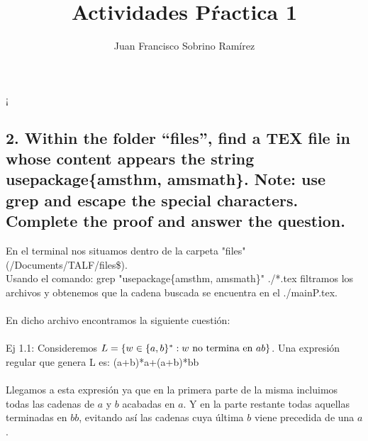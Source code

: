 \documentclass[20pt,oneside]{extbook}
\title{\Huge {Actividades Pŕactica 1}}
\author{Juan Francisco Sobrino Ramírez}
\date{}
\begin{document}
\maketitle

\newpage 
¡


\subsection*{2. Within the folder “files”, find a TEX file in whose content appears the string usepackage\{amsthm, amsmath\}. Note: use grep and escape the special characters.\\Complete the proof and answer the question.}
 
 En el terminal nos situamos dentro de la carpeta "files" (/Documents/TALF/files\$). \\
 Usando el comando: grep "usepackage\{amsthm, amsmath\}" ./*.tex filtramos los archivos y obtenemos que la cadena buscada se encuentra en el ./mainP.tex.\\
\\
En dicho archivo encontramos la siguiente cuestión:\\ 
\\
Ej 1.1: Consideremos $L=\{w\in \{a,b\}^* : w \textnormal{ no termina en } ab\}$. Una expresión regular que genera L es: (a+b)*a+(a+b)*bb \\
\\
Llegamos a esta expresión ya que en la primera parte de la misma incluimos todas las cadenas de $a$ y $b$ acabadas en $a$.  Y en la parte restante todas aquellas terminadas en $bb$, evitando así las cadenas cuya última $b$ viene precedida de una $a$.
\end{document}
